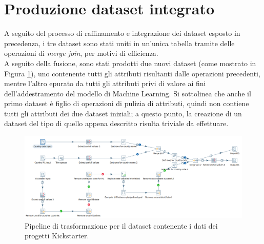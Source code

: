 \newpage
\section{Produzione dataset integrato}
A seguito del processo di raffinamento e integrazione dei dataset esposto in precedenza, i tre dataset sono stati uniti in un'unica tabella tramite delle operazioni di \textit{merge join}, per motivi di efficienza.\\
A seguito della fusione, sono stati prodotti due nuovi dataset (come mostrato in Figura \ref{fig:transformationcomplete}), uno contenente tutti gli attributi risultanti dalle operazioni precedenti, mentre l'altro epurato da tutti gli attributi privi di valore ai fini dell'addestramento del modello di Machine Learning. Si sottolinea che anche il primo dataset è figlio di operazioni di pulizia di attributi, quindi non contiene tutti gli attributi dei due dataset iniziali; a questo punto, la creazione di un dataset del tipo di quello appena descritto risulta triviale da effettuare.

\begin{figure}[p!]
	\centering
	\includegraphics[angle=90,origin=c,height=1.1\linewidth]{images/transformation_complete}
	\caption{Pipeline di trasformazione per il dataset contenente i dati dei progetti Kickstarter.}
	\label{fig:transformationcomplete}
\end{figure}

